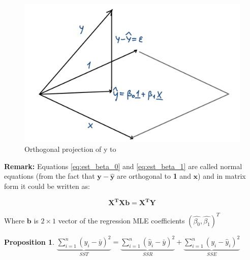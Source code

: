 \documentclass[12pt,a4paper,oneside]{book} %
\newtheorem{proposition}[theorem]{Proposition}
\begin{document}
\begin{figure}
	\centering
	\includegraphics[width=\linewidth]{projection.png}
	\caption{Orthogonal projection of y to }
	\label{fig:projection}
\end{figure}%




\textbf{Remark:} Equations \ref{eq:est_beta_0} and \ref{eq:est_beta_1} are called normal equations \cite{neter1983applied} (from the fact that $\mathbf{y-\hat{y}}$ are orthogonal to \textbf{1} and $\mathbf{x}$) and in matrix form it could be written as:

\begin{equation} \label{eq:matrix_form_ols}
	\mathbf{X^TXb = X^TY}
\end{equation}

Where $\mathbf{b}$ is $2 \times 1 $ vector of the regression MLE coefficients $(\hat{\beta_0}, \hat{\beta_1})^T$ 


\begin{proposition} \label{prop:sst_equation}
	$\underbrace{\sum_{i=1}^{n} (y_i - \bar{y})^2}_{SST} = \underbrace{\sum_{i=1}^{n} (\hat{y}_i - \bar{y})^2}_{SSR} + \underbrace{\sum_{i=1}^{n} (y_i - \hat{y}_i)^2}_{SSE}$
\end{proposition}
\end{document}
